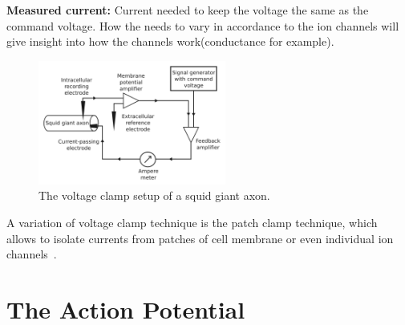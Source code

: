 \documentclass[class={myRUCProject}, crop=false]{standalone}
\begin{document}
\textbf{ Measured current:} Current needed to keep the voltage the same as the command voltage. How the needs to vary in accordance to the ion channels will give insight into how the channels work(conductance for example).

\begin{figure}[H]
    \centering
    \includegraphics[width=0.55\textwidth]{Pictures/Anakin/Vclamp.png}
    \caption{The voltage clamp setup of a squid giant axon.}\label{fig:Vclamp}
\end{figure} 

A variation of  voltage clamp technique is the patch clamp technique, which allows to isolate currents from patches of cell membrane or even individual ion channels~\cite{Hammond2015ch4}.%

\section{The Action Potential}\label{sec:ap}




\end{document}
